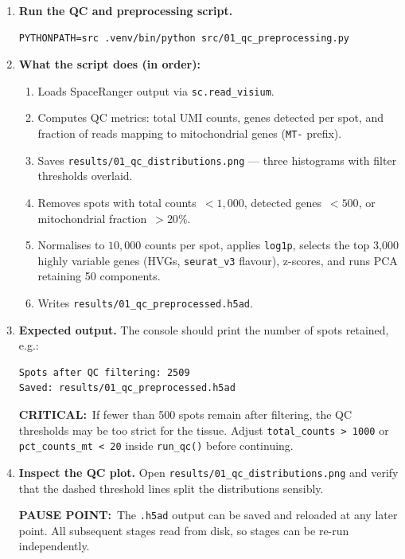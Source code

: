 \documentclass[12pt, a4paper]{article}
\newcommand{\critical}[1]{\par\smallskip\noindent%
    {\color{red!65!black}\bfseries CRITICAL:}\ #1\par\smallskip}
\newcommand{\pausept}[1]{\par\smallskip\noindent%
    {\bfseries PAUSE POINT:}\ #1\par\smallskip}
\begin{document}
\begin{enumerate}

\item \textbf{Run the QC and preprocessing script.}
\begin{lstlisting}
PYTHONPATH=src .venv/bin/python src/01_qc_preprocessing.py
\end{lstlisting}

\item \textbf{What the script does (in order):}
\begin{enumerate}
    \item Loads SpaceRanger output via \texttt{sc.read\_visium}.
    \item Computes QC metrics: total UMI counts, genes detected per spot,
          and fraction of reads mapping to mitochondrial genes
          (\texttt{MT-} prefix).
    \item Saves \texttt{results/01\_qc\_distributions.png} — three
          histograms with filter thresholds overlaid.
    \item Removes spots with total counts~$<1{,}000$, detected
          genes~$<500$, or mitochondrial fraction~$>20\%$.
    \item Normalises to $10{,}000$ counts per spot, applies
          \texttt{log1p}, selects the top 3,000 highly variable genes
          (HVGs, \texttt{seurat\_v3} flavour), z-scores, and runs
          PCA retaining 50 components.
    \item Writes \texttt{results/01\_qc\_preprocessed.h5ad}.
\end{enumerate}

\item \textbf{Expected output.}
The console should print the number of spots retained, e.g.:
\begin{lstlisting}
Spots after QC filtering: 2509
Saved: results/01_qc_preprocessed.h5ad
\end{lstlisting}
\critical{If fewer than 500 spots remain after filtering, the QC
thresholds may be too strict for the tissue.  Adjust
\texttt{total\_counts > 1000} or \texttt{pct\_counts\_mt < 20}
inside \texttt{run\_qc()} before continuing.}

\item \textbf{Inspect the QC plot.}
Open \texttt{results/01\_qc\_distributions.png} and verify that the
dashed threshold lines split the distributions sensibly.

\pausept{The \texttt{.h5ad} output can be saved and reloaded at any
later point.  All subsequent stages read from disk, so stages can be
re-run independently.}

\end{enumerate}
\end{document}
